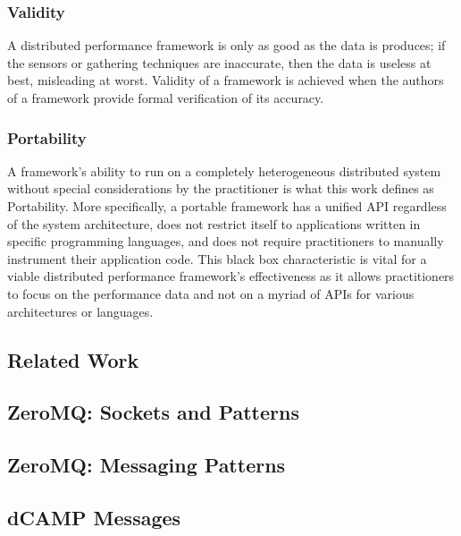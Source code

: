 \documentclass{beamer}
\begin{document}
\begin{frame}
\frametitle{Validity}
A distributed performance framework is only as good as the data is produces; if the sensors or gathering techniques are
inaccurate, then the data is useless at best, misleading at worst. Validity of a framework is achieved when the authors
of a framework provide formal verification of its accuracy.
\end{frame}

\begin{frame}
\frametitle{Portability}
A framework's ability to run on a completely heterogeneous distributed system without special considerations by the
practitioner is what this work defines as Portability. More specifically, a portable framework has a unified API
regardless of the system architecture, does not restrict itself to applications written in specific programming
languages, and does not require practitioners to manually instrument their application code. This black box
characteristic is vital for a viable distributed performance framework's effectiveness as it allows practitioners to
focus on the performance data and not on a myriad of APIs for various architectures or languages.
\end{frame}

\subsection{Related Work}

\subsection{ZeroMQ: Sockets and Patterns}

\subsection{ZeroMQ: Messaging Patterns}

\subsection{dCAMP Messages}
\end{document}
